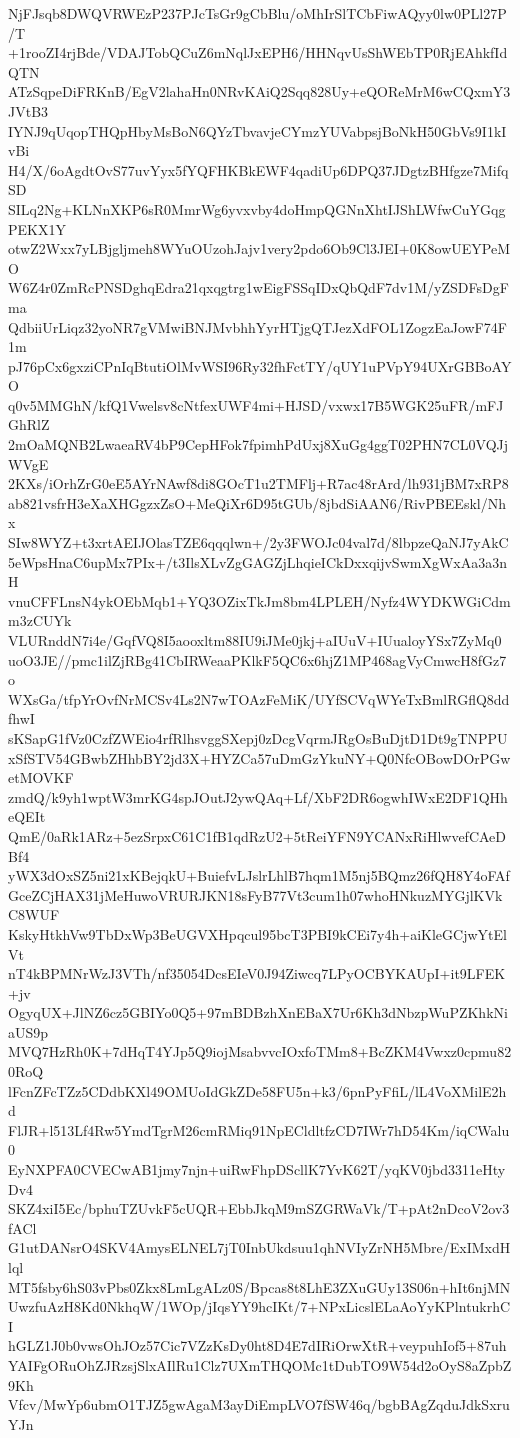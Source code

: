 NjFJsqb8DWQVRWEzP237PJcTsGr9gCbBlu/oMhIrSlTCbFiwAQyy0lw0PLl27P/T
+1rooZI4rjBde/VDAJTobQCuZ6mNqlJxEPH6/HHNqvUsShWEbTP0RjEAhkfIdQTN
ATzSqpeDiFRKnB/EgV2lahaHn0NRvKAiQ2Sqq828Uy+eQOReMrM6wCQxmY3JVtB3
IYNJ9qUqopTHQpHbyMsBoN6QYzTbvavjeCYmzYUVabpsjBoNkH50GbVs9I1kIvBi
H4/X/6oAgdtOvS77uvYyx5fYQFHKBkEWF4qadiUp6DPQ37JDgtzBHfgze7MifqSD
SILq2Ng+KLNnXKP6sR0MmrWg6yvxvby4doHmpQGNnXhtIJShLWfwCuYGqgPEKX1Y
otwZ2Wxx7yLBjgljmeh8WYuOUzohJajv1very2pdo6Ob9Cl3JEI+0K8owUEYPeMO
W6Z4r0ZmRcPNSDghqEdra21qxqgtrg1wEigFSSqIDxQbQdF7dv1M/yZSDFsDgFma
QdbiiUrLiqz32yoNR7gVMwiBNJMvbhhYyrHTjgQTJezXdFOL1ZogzEaJowF74F1m
pJ76pCx6gxziCPnIqBtutiOlMvWSI96Ry32fhFctTY/qUY1uPVpY94UXrGBBoAYO
q0v5MMGhN/kfQ1Vwelsv8cNtfexUWF4mi+HJSD/vxwx17B5WGK25uFR/mFJGhRlZ
2mOaMQNB2LwaeaRV4bP9CepHFok7fpimhPdUxj8XuGg4ggT02PHN7CL0VQJjWVgE
2KXs/iOrhZrG0eE5AYrNAwf8di8GOcT1u2TMFlj+R7ac48rArd/lh931jBM7xRP8
ab821vsfrH3eXaXHGgzxZsO+MeQiXr6D95tGUb/8jbdSiAAN6/RivPBEEskl/Nhx
SIw8WYZ+t3xrtAEIJOlasTZE6qqqlwn+/2y3FWOJc04val7d/8lbpzeQaNJ7yAkC
5eWpsHnaC6upMx7PIx+/t3IlsXLvZgGAGZjLhqieICkDxxqijvSwmXgWxAa3a3nH
vnuCFFLnsN4ykOEbMqb1+YQ3OZixTkJm8bm4LPLEH/Nyfz4WYDKWGiCdmm3zCUYk
VLURnddN7i4e/GqfVQ8I5aooxltm88IU9iJMe0jkj+aIUuV+IUualoyYSx7ZyMq0
uoO3JE//pmc1ilZjRBg41CbIRWeaaPKlkF5QC6x6hjZ1MP468agVyCmwcH8fGz7o
WXsGa/tfpYrOvfNrMCSv4Ls2N7wTOAzFeMiK/UYfSCVqWYeTxBmlRGflQ8ddfhwI
sKSapG1fVz0CzfZWEio4rfRlhsvggSXepj0zDcgVqrmJRgOsBuDjtD1Dt9gTNPPU
xSfSTV54GBwbZHhbBY2jd3X+HYZCa57uDmGzYkuNY+Q0NfcOBowDOrPGwetMOVKF
zmdQ/k9yh1wptW3mrKG4spJOutJ2ywQAq+Lf/XbF2DR6ogwhIWxE2DF1QHheQEIt
QmE/0aRk1ARz+5ezSrpxC61C1fB1qdRzU2+5tReiYFN9YCANxRiHlwvefCAeDBf4
yWX3dOxSZ5ni21xKBejqkU+BuiefvLJslrLhlB7hqm1M5nj5BQmz26fQH8Y4oFAf
GceZCjHAX31jMeHuwoVRURJKN18sFyB77Vt3cum1h07whoHNkuzMYGjlKVkC8WUF
KskyHtkhVw9TbDxWp3BeUGVXHpqcul95bcT3PBI9kCEi7y4h+aiKleGCjwYtElVt
nT4kBPMNrWzJ3VTh/nf35054DcsEIeV0J94Ziwcq7LPyOCBYKAUpI+it9LFEK+jv
OgyqUX+JlNZ6cz5GBIYo0Q5+97mBDBzhXnEBaX7Ur6Kh3dNbzpWuPZKhkNiaUS9p
MVQ7HzRh0K+7dHqT4YJp5Q9iojMsabvvcIOxfoTMm8+BcZKM4Vwxz0cpmu820RoQ
lFcnZFcTZz5CDdbKXl49OMUoIdGkZDe58FU5n+k3/6pnPyFfiL/lL4VoXMilE2hd
FlJR+l513Lf4Rw5YmdTgrM26cmRMiq91NpECldltfzCD7IWr7hD54Km/iqCWalu0
EyNXPFA0CVECwAB1jmy7njn+uiRwFhpDScllK7YvK62T/yqKV0jbd3311eHtyDv4
SKZ4xiI5Ec/bphuTZUvkF5cUQR+EbbJkqM9mSZGRWaVk/T+pAt2nDcoV2ov3fACl
G1utDANsrO4SKV4AmysELNEL7jT0InbUkdsuu1qhNVIyZrNH5Mbre/ExIMxdHlql
MT5fsby6hS03vPbs0Zkx8LmLgALz0S/Bpcas8t8LhE3ZXuGUy13S06n+hIt6njMN
UwzfuAzH8Kd0NkhqW/1WOp/jIqsYY9hcIKt/7+NPxLicslELaAoYyKPlntukrhCI
hGLZ1J0b0vwsOhJOz57Cic7VZzKsDy0ht8D4E7dIRiOrwXtR+veypuhIof5+87uh
YAIFgORuOhZJRzsjSlxAIlRu1Clz7UXmTHQOMc1tDubTO9W54d2oOyS8aZpbZ9Kh
Vfcv/MwYp6ubmO1TJZ5gwAgaM3ayDiEmpLVO7fSW46q/bgbBAgZqduJdkSxruYJn
